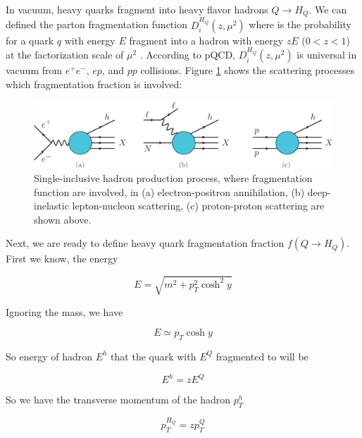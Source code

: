 In vacuum, heavy quarks fragment into heavy flavor hadrons $Q \rightarrow H_Q$. We can defined the parton fragmentation function $D^{H_Q}_{i}(z,\mu^2)$ where is the probability for a quark $q$ with energy $E$ fragment into a hadron with energy $zE$ ($0 < z < 1$) at the factorization scale of $\mu^2$ \cite{QCDFFunc}. According to pQCD, $D^{H_Q}_{i}(z,\mu^2)$ is universal in vacuum from $e^+e^-$, $ep$, and $pp$ collisions. Figure \ref{FFProcess} shows the scattering processes which fragmentation fraction is involved:

 \begin{figure}[hbtp]
\begin{center}
\includegraphics[width=1.0\textwidth]{Figures/Chapter1/FFProcess.png}
\caption{Single-inclusive hadron production process, where fragmentation function are involved, in (a) electron-positron annihilation, (b) deep-inelastic lepton-nucleon scattering, (c) proton-proton scattering are shown above.}
\label{FFProcess}
\end{center}
\end{figure}   

Next, we are ready to define heavy quark fragmentation fraction $f(Q \rightarrow H_Q)$. First we know, the energy

\begin{equation}
E=  \sqrt{m^2 + p_T^2 \cosh^2 y}
\end{equation}

Ignoring the mass, we have

\begin{equation}
E \simeq p_T \cosh y
\end{equation}

So energy of hadron $E^h$ that the quark with $E^Q$ fragmented to will be


\begin{equation}
E^h  = z E^Q 
\end{equation}

So we have the transverse momentum of the hadron $p_T^h$ 

\begin{equation}
p_T^{H_Q} = z p_T^Q
\end{equation}

